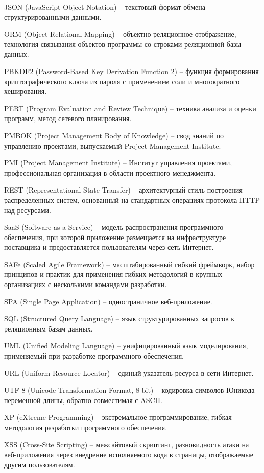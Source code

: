 JSON (JavaScript Object Notation) -- текстовый формат обмена структурированными данными.

ORM (Object-Relational Mapping) -- объектно-реляционное отображение, технология связывания объектов программы со строками реляционной базы данных.

PBKDF2 (Password-Based Key Derivation Function 2) -- функция формирования криптографического ключа из пароля с применением соли и многократного хеширования.

PERT (Program Evaluation and Review Technique) -- техника анализа и оценки программ, метод сетевого планирования.

PMBOK (Project Management Body of Knowledge) -- свод знаний по управлению проектами, выпускаемый Project Management Institute.

PMI (Project Management Institute) -- Институт управления проектами, профессиональная организация в области проектного менеджмента.

REST (Representational State Transfer) -- архитектурный стиль построения распределенных систем, основанный на стандартных операциях протокола HTTP над ресурсами.

SaaS (Software as a Service) -- модель распространения программного обеспечения, при которой приложение размещается на инфраструктуре поставщика и предоставляется пользователям через сеть Интернет.

SAFe (Scaled Agile Framework) -- масштабированный гибкий фреймворк, набор принципов и практик для применения гибких методологий в крупных организациях с несколькими командами разработки.

SPA (Single Page Application) -- одностраничное веб-приложение.

SQL (Structured Query Language) -- язык структурированных запросов к реляционным базам данных.

UML (Unified Modeling Language) -- унифицированный язык моделирования, применяемый при разработке программного обеспечения.

URL (Uniform Resource Locator) -- единый указатель ресурса в сети Интернет.

UTF-8 (Unicode Transformation Format, 8-bit) -- кодировка символов Юникода переменной длины, обратно совместимая с ASCII.

XP (eXtreme Programming) -- экстремальное программирование, гибкая методология разработки программного обеспечения.

XSS (Cross-Site Scripting) -- межсайтовый скриптинг, разновидность атаки на веб-приложения через внедрение исполняемого кода в страницы, отображаемые другим пользователям.
